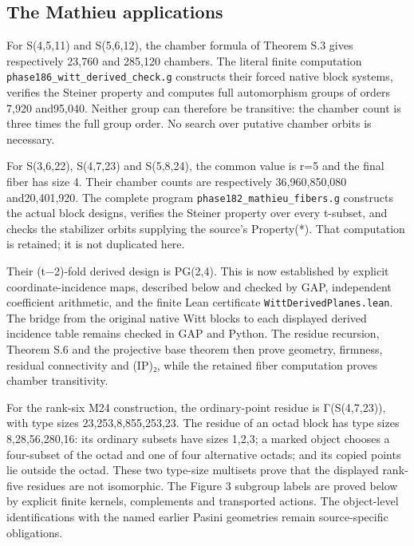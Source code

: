 \subsection{The Mathieu applications}\label{the-mathieu-applications}

For S(4,5,11) and S(5,6,12), the chamber formula of Theorem S.3 gives
respectively 23,760 and 285,120 chambers. The literal finite computation
\texttt{phase186\_witt\_derived\_check.g} constructs their forced native block
systems, verifies the Steiner property and computes full automorphism
groups of orders 7,920 and95,040. Neither group can therefore be
transitive: the chamber count is three times the full group order. No
search over putative chamber orbits is necessary.

For S(3,6,22), S(4,7,23) and S(5,8,24), the common value is r=5 and the
final fiber has size 4. Their chamber counts are
respectively 36,960,850,080 and20,401,920. The complete program
\texttt{phase182\_mathieu\_fibers.g} constructs the actual block
designs, verifies the Steiner property over every t-subset, and checks
the stabilizer orbits supplying the source's Property(*). That
computation is retained; it is not duplicated here.

Their (t−2)-fold derived design is PG(2,4). This is now established by
explicit coordinate-incidence maps, described below and checked by GAP,
independent coefficient arithmetic, and the finite Lean certificate
\texttt{WittDerivedPlanes.lean}. The bridge from the original native
Witt blocks to each displayed derived incidence table remains checked in
GAP and Python. The residue recursion, Theorem S.6 and the projective
base theorem then prove geometry, firmness, residual connectivity and
(IP)₂, while the retained fiber computation proves chamber transitivity.

For the rank-six M24 construction, the ordinary-point residue is
Γ(S(4,7,23)), with type sizes 23,253,8,855,253,23. The residue of an
octad block has type sizes 8,28,56,280,16: its ordinary subsets have
sizes 1,2,3; a marked object chooses a four-subset of the octad and one
of four alternative octads; and its copied points lie outside the octad.
These two type-size multisets prove that the displayed rank-five
residues are not isomorphic. The Figure 3 subgroup labels are proved
below by explicit finite kernels, complements and transported actions.
The object-level identifications with the named earlier Pasini
geometries remain source-specific obligations.
